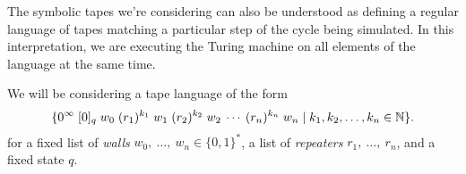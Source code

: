 \begin{remark} The symbolic tapes we're considering can also be understood as
defining a regular language of tapes matching a particular step of the cycle
being simulated. In this interpretation, we are executing the Turing machine
on all elements of the language at the same time.
\end{remark}

We will be considering a tape language of the form
\begin{equation}
    \{
    0^\infty\; [0]_q\; w_0\; (r_1)^{k_1}\; w_1\; (r_2)^{k_2}\; w_2\: \cdots\: (r_n)^{k_n}\; w_n
    \mid k_1, k_2, \ldots, k_n \in \mathbb{N}
    \}.
\end{equation}
for a fixed list of \emph{walls} $w_0,\ \ldots,\ w_n \in \{0, 1\}^*$,
a list of \emph{repeaters} $r_1,\ \ldots,\ r_n$, and a fixed state $q$.
